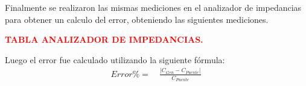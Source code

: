 Finalmente se realizaron las mismas mediciones en el analizador de impedancias para obtener un calculo del error, obteniendo las siguientes mediciones.\\
\begin{center} 
	\begin{Huge}
		\textcolor{red}{\textbf{TABLA ANALIZADOR DE IMPEDANCIAS.}}
	\end{Huge}
\end{center}

Luego el error fue calculado utilizando la siguiente fórmula:
\begin{equation*}
\begin{split}
	 Error \% =& \ \frac{|C_{Gen}-C_{Puente}|}{C_{Puente}}\ 
\end{split}
\end{equation*}
